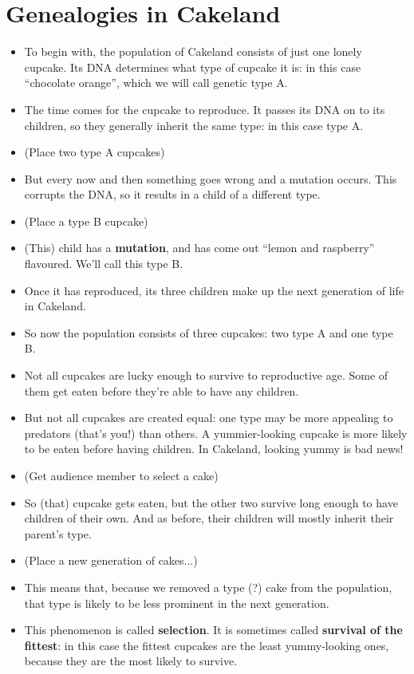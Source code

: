 \documentclass{article}
\begin{document}
\section*{Genealogies in Cakeland}
\begin{itemize}
\item To begin with, the population of Cakeland consists of just one lonely cupcake. Its DNA determines what type of cupcake it is: in this case ``chocolate orange'', which we will call genetic type A.
\item The time comes for the cupcake to reproduce. It passes its DNA on to its children, so they generally inherit the same type: in this case type A.
\item (Place two type A cupcakes)
\item But every now and then something goes wrong and a mutation occurs. This corrupts the DNA, so it results in a child of a different type.
\item (Place a type B cupcake)
\item (This) child has a \textbf{mutation}, and has come out ``lemon and raspberry'' flavoured. We'll call this type B.
\item Once it has reproduced, its three children make up the next generation of life in Cakeland.
\item So now the population consists of three cupcakes: two type A and one type B.
\item Not all cupcakes are lucky enough to survive to reproductive age. Some of them get eaten before they're able to have any children.
\item But not all cupcakes are created equal: one type may be more appealing to predators (that's you!) than others. A yummier-looking cupcake is more likely to be eaten before having children. In Cakeland, looking yummy is bad news!
\item (Get audience member to select a cake)
\item So (that) cupcake gets eaten, but the other two survive long enough to have children of their own. And as before, their children will mostly inherit their parent's type.
\item (Place a new generation of cakes...)
\item This means that, because we removed a type (?) cake from the population, that type is likely to be less prominent in the next generation.
\item This phenomenon is called \textbf{selection}. It is sometimes called \textbf{survival of the fittest}: in this case the fittest cupcakes are the least yummy-looking ones, because they are the most likely to survive.

\end{itemize}
\end{document}
